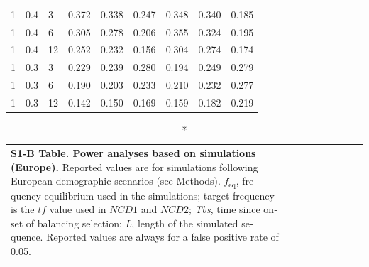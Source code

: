 \begin{refsection}
\begin{otherlanguage}{english}
\begin{scriptsize}
\begin{longtable}{lllllllll}
\cellcolor[HTML]{C0C0C0}1 & \cellcolor[HTML]{C0C0C0}0.4 & \cellcolor[HTML]{C0C0C0}3 & 0.372 & 0.338 & 0.247 & 0.348 & 0.340 & 0.185 \\
\cellcolor[HTML]{C0C0C0}1 & \cellcolor[HTML]{C0C0C0}0.4 & \cellcolor[HTML]{C0C0C0}6 & 0.305 & 0.278 & 0.206 & 0.355 & 0.324 & 0.195 \\
\cellcolor[HTML]{C0C0C0}1 & \cellcolor[HTML]{C0C0C0}0.4 & \cellcolor[HTML]{C0C0C0}12 & 0.252 & 0.232 & 0.156 & 0.304 & 0.274 & 0.174 \\
\cellcolor[HTML]{C0C0C0}1 & \cellcolor[HTML]{C0C0C0}0.3 & \cellcolor[HTML]{C0C0C0}3 & 0.229 & 0.239 & 0.280 & 0.194 & 0.249 & 0.279 \\
\cellcolor[HTML]{C0C0C0}1 & \cellcolor[HTML]{C0C0C0}0.3 & \cellcolor[HTML]{C0C0C0}6 & 0.190 & 0.203 & 0.233 & 0.210 & 0.232 & 0.277 \\
\cellcolor[HTML]{C0C0C0}1 & \cellcolor[HTML]{C0C0C0}0.3 & \cellcolor[HTML]{C0C0C0}12 & 0.142 & 0.150 & 0.169 & 0.159 & 0.182 & 0.219 \\ \hline
\end{longtable}
\end{scriptsize}

\begin{scriptsize}
\begin{longtable}{lllllllll}
\caption*{\textbf{S1-B Table. Power analyses based on simulations (Europe).} Reported values are for simulations following European demographic scenarios (see Methods). $f_{\mathrm{eq}}$, frequency equilibrium used in the simulations; target frequency is the $tf$ value used in $NCD1$ and $NCD2$; \emph{Tbs}, time since onset of balancing selection; \emph{L}, length of the simulated sequence. Reported values are always for a false positive rate of 0.05.} \\
\cline{4-9}


\end{longtable}
\end{scriptsize}
\end{otherlanguage}
\end{refsection}
